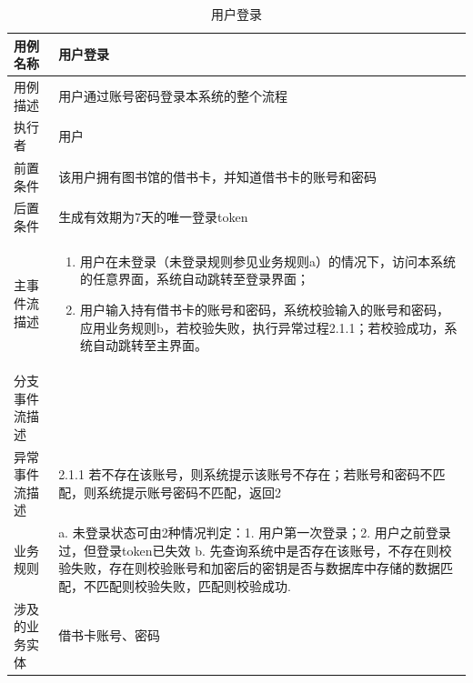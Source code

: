 \begin{table}[hp]
    \centering
    \caption{用户登录}
	\begin{tabular*}{\textwidth}{p{}|p{}}
    \hline
    用例名称    & 用户登录                                                                                                                             \\ \hline
    用例描述    & 用户通过账号密码登录本系统的整个流程                                                                                                               \\ \hline
    执行者     & 用户                                                                                                                               \\ \hline
    前置条件    & 该用户拥有图书馆的借书卡，并知道借书卡的账号和密码                                                                                                        \\ \hline
    后置条件    & 生成有效期为7天的唯一登录token                                                                                                                             \\ \hline
    主事件流描述  & \begin{enumerate} 
            \item 用户在未登录（未登录规则参见业务规则a）的情况下，访问本系统的任意界面，系统自动跳转至登录界面；
            \item 用户输入持有借书卡的账号和密码，系统校验输入的账号和密码，应用业务规则b，若校验失败，执行异常过程2.1.1；若校验成功，系统自动跳转至主界面。
        \end{enumerate} \\ \hline
    分支事件流描述 & ~                                                                                                                                \\ \hline
    异常事件流描述 & 2.1.1 若不存在该账号，则系统提示该账号不存在；若账号和密码不匹配，则系统提示账号密码不匹配，返回2                                                                             \\ \hline
    业务规则    & a. 未登录状态可由2种情况判定：1. 用户第一次登录；2.  用户之前登录过，但登录token已失效 b. 先查询系统中是否存在该账号，不存在则校验失败，存在则校验账号和加密后的密钥是否与数据库中存储的数据匹配，不匹配则校验失败，匹配则校验成功.    \\ \hline
    涉及的业务实体 & 借书卡账号、密码                                                           \\ \hline
\end{tabular*}
\end{table}
